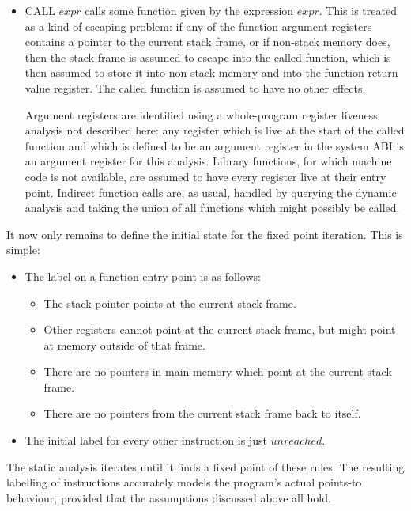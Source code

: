 \begin{itemize}
\item
  CALL $expr$ calls some function given by the expression $expr$.
  This is treated as a kind of escaping problem: if any of the
  function argument registers contains a pointer to the current stack
  frame, or if non-stack memory does, then the stack frame is assumed
  to escape into the called function, which is then assumed to store
  it into non-stack memory and into the function return value
  register.  The called function is assumed to have no other
  effects.

  Argument registers are identified using a whole-program register
  liveness analysis not described here: any register which is live at
  the start of the called function and which is defined to be an
  argument register in the system ABI is an argument register for this
  analysis.  Library functions, for which machine code is not
  available, are assumed to have every register live at their entry
  point.  Indirect function calls are, as usual, handled by querying
  the dynamic analysis and taking the union of all functions which
  might possibly be called.
\end{itemize}

It now only remains to define the initial state for the fixed point
iteration.  This is simple:

\begin{itemize}
\item
  The label on a function entry point is as follows:

  \begin{itemize}
  \item The stack pointer points at the current stack frame.
  \item Other registers cannot point at the current stack frame, but
    might point at memory outside of that frame.
  \item There are no pointers in main memory which point at the current
    stack frame.
  \item There are no pointers from the current stack frame back to
    itself.
  \end{itemize}
\item
  The initial label for every other instruction is just $unreached$.
\end{itemize}

The static analysis iterates until it finds a fixed point of these
rules.  The resulting labelling of instructions accurately models the
program's actual points-to behaviour, provided that the assumptions
discussed above all hold.

